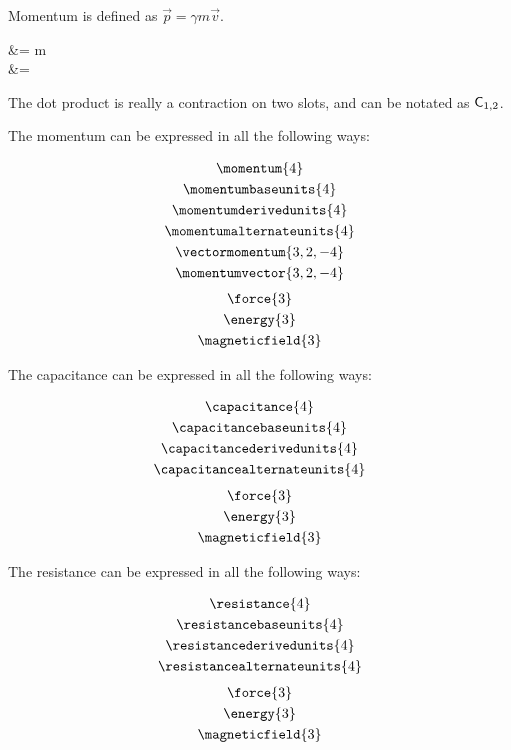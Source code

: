 \documentclass{article}
\begin{document}
Momentum is defined as \( \vec{p} = \gamma m\vec{v}\).

\begin{physicssolution}
   &= \gamma m   \\
   &=  
\end{physicssolution}

The dot product is really a contraction on two slots, and can be notated 
as \( \contraction*{1,2} \).

\newpage
The momentum can be expressed in all the following ways:

\begin{gather*}
 \momentum{4}               \\
 \momentumbaseunits{4}      \\
 \momentumderivedunits{4}   \\
 \momentumalternateunits{4} \\
 \vectormomentum{3,2,-4}    \\
 \momentumvector{3,2,-4}
\end{gather*}
\begin{gather*}
  \force{3}         \\
  \energy{3}        \\
  \magneticfield{3}
\end{gather*}

The capacitance can be expressed in all the following ways:

\begin{gather*}
 \capacitance{4}               \\
 \capacitancebaseunits{4}      \\
 \capacitancederivedunits{4}   \\
 \capacitancealternateunits{4}
\end{gather*}
\begin{gather*}
  \force{3}         \\
  \energy{3}        \\
  \magneticfield{3}
\end{gather*}

The resistance can be expressed in all the following ways:

\begin{gather*}
 \resistance{4}               \\
 \resistancebaseunits{4}      \\
 \resistancederivedunits{4}   \\
 \resistancealternateunits{4}
\end{gather*}
\begin{gather*}
  \force{3}         \\
  \energy{3}        \\
  \magneticfield{3}
\end{gather*}
\end{document}
